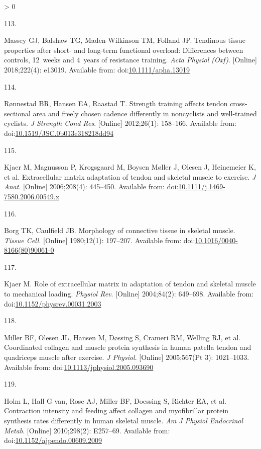 \documentclass[twoside,10pt]{gihclass} %
\newlength{\cslhangindent}
\newlength{\csllabelwidth}
\newenvironment{CSLReferences}[3] %
 {%
  \setlength{\parindent}{0pt}
  \ifodd #1 \everypar{\setlength{\hangindent}{\cslhangindent}}\ignorespaces\fi
  \ifnum #2 > 0
  \setlength{\parskip}{#2\baselineskip}
  \fi
 }%
 {}
\newcommand{\CSLLeftMargin}[1]{\parbox[t]{\maxof{\widthof{#1}}{\csllabelwidth}}{#1}}
\newcommand{\CSLRightInline}[1]{\parbox[t]{\linewidth}{#1}}
\begin{document}
\begin{CSLReferences}{0}{0}
\leavevmode\hypertarget{ref-RN2772}{}%
\CSLLeftMargin{113. }
\CSLRightInline{Massey GJ, Balshaw TG, Maden-Wilkinson TM, Folland JP. Tendinous tissue properties after short- and long-term functional overload: Differences between controls, 12~weeks and 4~years of resistance training. \emph{Acta Physiol (Oxf)}. {[}Online{]} 2018;222(4): e13019. Available from: doi:\href{https://doi.org/10.1111/apha.13019}{10.1111/apha.13019}}

\leavevmode\hypertarget{ref-RN2895}{}%
\CSLLeftMargin{114. }
\CSLRightInline{Rønnestad BR, Hansen EA, Raastad T. Strength training affects tendon cross-sectional area and freely chosen cadence differently in noncyclists and well-trained cyclists. \emph{J Strength Cond Res}. {[}Online{]} 2012;26(1): 158--166. Available from: doi:\href{https://doi.org/10.1519/JSC.0b013e318218dd94}{10.1519/JSC.0b013e318218dd94}}

\leavevmode\hypertarget{ref-RN2770}{}%
\CSLLeftMargin{115. }
\CSLRightInline{Kjaer M, Magnusson P, Krogsgaard M, Boysen Møller J, Olesen J, Heinemeier K, et al. Extracellular matrix adaptation of tendon and skeletal muscle to exercise. \emph{J Anat}. {[}Online{]} 2006;208(4): 445--450. Available from: doi:\href{https://doi.org/10.1111/j.1469-7580.2006.00549.x}{10.1111/j.1469-7580.2006.00549.x}}

\leavevmode\hypertarget{ref-RN2783}{}%
\CSLLeftMargin{116. }
\CSLRightInline{Borg TK, Caulfield JB. Morphology of connective tissue in skeletal muscle. \emph{Tissue Cell}. {[}Online{]} 1980;12(1): 197--207. Available from: doi:\href{https://doi.org/10.1016/0040-8166(80)90061-0}{10.1016/0040-8166(80)90061-0}}

\leavevmode\hypertarget{ref-RN2421}{}%
\CSLLeftMargin{117. }
\CSLRightInline{Kjaer M. Role of extracellular matrix in adaptation of tendon and skeletal muscle to mechanical loading. \emph{Physiol Rev}. {[}Online{]} 2004;84(2): 649--698. Available from: doi:\href{https://doi.org/10.1152/physrev.00031.2003}{10.1152/physrev.00031.2003}}

\leavevmode\hypertarget{ref-RN2788}{}%
\CSLLeftMargin{118. }
\CSLRightInline{Miller BF, Olesen JL, Hansen M, Døssing S, Crameri RM, Welling RJ, et al. Coordinated collagen and muscle protein synthesis in human patella tendon and quadriceps muscle after exercise. \emph{J Physiol}. {[}Online{]} 2005;567(Pt 3): 1021--1033. Available from: doi:\href{https://doi.org/10.1113/jphysiol.2005.093690}{10.1113/jphysiol.2005.093690}}

\leavevmode\hypertarget{ref-RN2454}{}%
\CSLLeftMargin{119. }
\CSLRightInline{Holm L, Hall G van, Rose AJ, Miller BF, Doessing S, Richter EA, et al. Contraction intensity and feeding affect collagen and myofibrillar protein synthesis rates differently in human skeletal muscle. \emph{Am J Physiol Endocrinol Metab}. {[}Online{]} 2010;298(2): E257--69. Available from: doi:\href{https://doi.org/10.1152/ajpendo.00609.2009}{10.1152/ajpendo.00609.2009}}


\end{CSLReferences}
\end{document}
